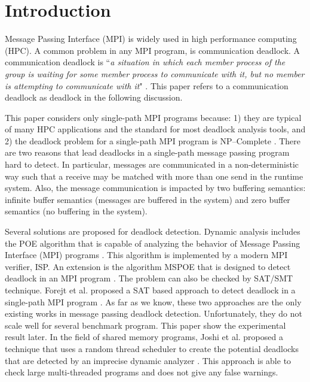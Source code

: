 \section{Introduction}
Message Passing Interface (MPI) is widely used in high performance computing (HPC). A common problem in any MPI program, is communication deadlock. A communication deadlock is ``\emph{a situation in which each member process of the group is waiting for some member process to communicate with it, but no member is attempting to communicate with it}" \cite{DBLP:conf/fsttcs/Natarajan84}. This paper refers to a communication deadlock as deadlock in the following discussion. 

This paper considers only single-path MPI programs because: 1) they are typical of many HPC applications and the standard for most deadlock analysis tools, and 2) the deadlock problem for a single-path MPI program is NP--Complete \cite{DBLP:conf/fm/ForejtKNS14}. There are two reasons that lead deadlocks in a single-path message passing program hard to detect. In particular, messages are communicated in a non-deterministic way such that a receive may be matched with more than one send in the runtime system. Also, the message communication is impacted by two buffering semantics: infinite buffer semantics (messages are buffered in the system) and zero buffer semantics (no buffering in the system). 

Several solutions are proposed for deadlock detection. Dynamic analysis includes the POE algorithm that is capable of analyzing the behavior of Message Passing Interface (MPI) programs \cite{DBLP:conf/ppopp/VakkalankaSGK08}. This algorithm is implemented by a modern MPI verifier, ISP. An extension is the algorithm MSPOE that is designed to detect deadlock in an MPI program \cite{DBLP:conf/sbmf/SharmaGB12}. The problem can also be checked by SAT/SMT technique. Forejt et al. proposed a SAT based approach to detect deadlock in a single-path MPI program \cite{DBLP:conf/fm/ForejtKNS14}. As far as we know, these two approaches are the only existing works in message passing deadlock detection. Unfortunately, they do not scale well for several benchmark program. This paper show the experimental result later. In the field of shared memory programs, Joshi et al. proposed a technique that uses a random thread scheduler to create the potential deadlocks that are detected by an imprecise dynamic analyzer \cite{DBLP:conf/pldi/JoshiPSN09}. This approach is able to check large multi-threaded programs and does not give any false warnings. 

